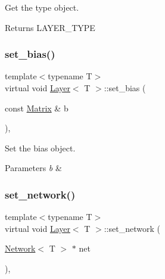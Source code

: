 Get the type object. 

\begin{DoxyReturn}{Returns}
L\+A\+Y\+E\+R\+\_\+\+T\+Y\+PE 
\end{DoxyReturn}
\mbox{\label{class_layer_a16eecfdfbd98cb94918b7d19ecaeb740}} 
\subsubsection{\texorpdfstring{set\_bias()}{set\_bias()}}
{\footnotesize\ttfamily template$<$typename T$>$ \\
virtual void \mbox{\hyperlink{class_layer}{Layer}}$<$ T $>$\+::set\+\_\+bias (\begin{DoxyParamCaption}\item[{const \mbox{\hyperlink{class_layer_a22b1e7286096aa62bd245536c8ebdaf1}{Matrix}} \&}]{b }\end{DoxyParamCaption})\hspace{0.3cm}{\ttfamily [inline]}, {\ttfamily [virtual]}}



Set the bias object. 


\begin{DoxyParams}{Parameters}
{\em b} & \\
\hline
\end{DoxyParams}
\mbox{\label{class_layer_a6281daa82294d6979eaa59acf0ea8f31}} 
\subsubsection{\texorpdfstring{set\_network()}{set\_network()}}
{\footnotesize\ttfamily template$<$typename T$>$ \\
virtual void \mbox{\hyperlink{class_layer}{Layer}}$<$ T $>$\+::set\+\_\+network (\begin{DoxyParamCaption}\item[{\mbox{\hyperlink{class_network}{Network}}$<$ T $>$ $\ast$}]{net }\end{DoxyParamCaption})\hspace{0.3cm}{\ttfamily [inline]}, {\ttfamily [virtual]}}



